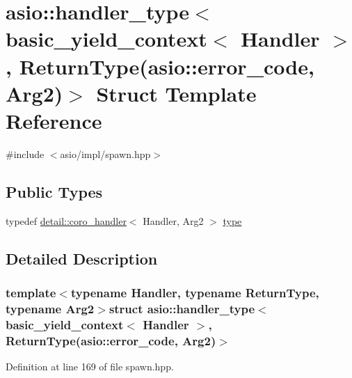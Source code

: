 \hypertarget{structasio_1_1handler__type_3_01basic__yield__context_3_01_handler_01_4_00_01_01_01_01_01_01_01_d15b502de1534464d7abfd193f1b4967}{}\section{asio\+:\+:handler\+\_\+type$<$ basic\+\_\+yield\+\_\+context$<$ Handler $>$, Return\+Type(asio\+:\+:error\+\_\+code, Arg2)$>$ Struct Template Reference}
\label{structasio_1_1handler__type_3_01basic__yield__context_3_01_handler_01_4_00_01_01_01_01_01_01_01_d15b502de1534464d7abfd193f1b4967}


{\ttfamily \#include $<$asio/impl/spawn.\+hpp$>$}

\subsection*{Public Types}
\begin{DoxyCompactItemize}
\item 
typedef \hyperlink{classasio_1_1detail_1_1coro__handler}{detail\+::coro\+\_\+handler}$<$ Handler, Arg2 $>$ \hyperlink{structasio_1_1handler__type_3_01basic__yield__context_3_01_handler_01_4_00_01_01_01_01_01_01_01_d15b502de1534464d7abfd193f1b4967_ac79206d3bc40e561474c164aa76250ec}{type}
\end{DoxyCompactItemize}


\subsection{Detailed Description}
\subsubsection*{template$<$typename Handler, typename Return\+Type, typename Arg2$>$struct asio\+::handler\+\_\+type$<$ basic\+\_\+yield\+\_\+context$<$ Handler $>$,           Return\+Type(asio\+::error\+\_\+code, Arg2)$>$}



Definition at line 169 of file spawn.\+hpp.



